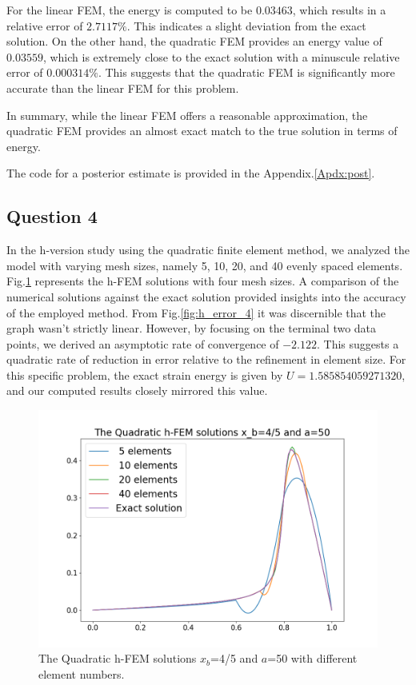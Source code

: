 \documentclass[twoside,twocolumn,10pt]{article}
\begin{document}
For the linear FEM, the energy is computed to be \(0.03463\), which results in a relative error of \(2.7117\%\). This indicates a slight deviation from the exact solution. On the other hand, the quadratic FEM provides an energy value of \(0.03559\), which is extremely close to the exact solution with a minuscule relative error of \(0.000314\%\). This suggests that the quadratic FEM is significantly more accurate than the linear FEM for this problem. 

In summary, while the linear FEM offers a reasonable approximation, the quadratic FEM provides an almost exact match to the true solution in terms of energy.

The code for a posterior estimate is provided in the Appendix.\ref{Apdx:post}.

\subsection{Question 4}
In the h-version study using the quadratic finite element method, we analyzed the model with varying mesh sizes, namely 5, 10, 20, and 40 evenly spaced elements. Fig.\ref{fig:q_4} represents the h-FEM solutions with four mesh sizes. A comparison of the numerical solutions against the exact solution provided insights into the accuracy of the employed method. From Fig.\ref{fig:h_error_4} it was discernible that the graph wasn't strictly linear. However, by focusing on the terminal two data points, we derived an asymptotic rate of convergence of \(-2.122\). This suggests a quadratic rate of reduction in error relative to the refinement in element size. For this specific problem, the exact strain energy is given by \( U = 1.585854059271320 \), and our computed results closely mirrored this value.  

\begin{figure}[!ht]
  \centering
  \includegraphics[width=1.\linewidth]{Q1/Q1_4.png}
  \caption{The Quadratic h-FEM solutions $x_b$=4/5 and $a$=50 with different element numbers.}
  \label{fig:q_4}
\end{figure}
\end{document}
